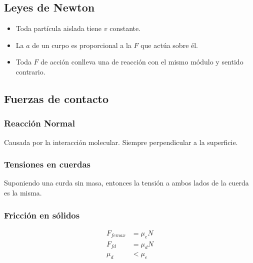 \documentclass[12pt]{article}
\begin{document}
	\subsection{Leyes de Newton}
\begin{itemize}
	\item Toda partícula aislada tiene $v$ constante.
	\item La $a$ de un curpo es proporcional a la $F$ que actúa sobre él.
	\item Toda $F$ de acción conlleva una de reacción con el mismo módulo y sentido contrario.
\end{itemize}

\subsection{Fuerzas de contacto}
\subsubsection{Reacción Normal}
Causada por la interacción molecular. Siempre perpendicular a la superficie.
\subsubsection{Tensiones en cuerdas}
Suponiendo una curda sin masa, entonces la tensión a ambos lados de la cuerda es la misma.
\subsubsection{Fricción en sólidos}




\begin{align*}
	F_{femax} &= \mu_eN \\
	F_{fd} &= \mu_dN \\
	\mu_d&<\mu_e
\end{align*}
\end{document}
